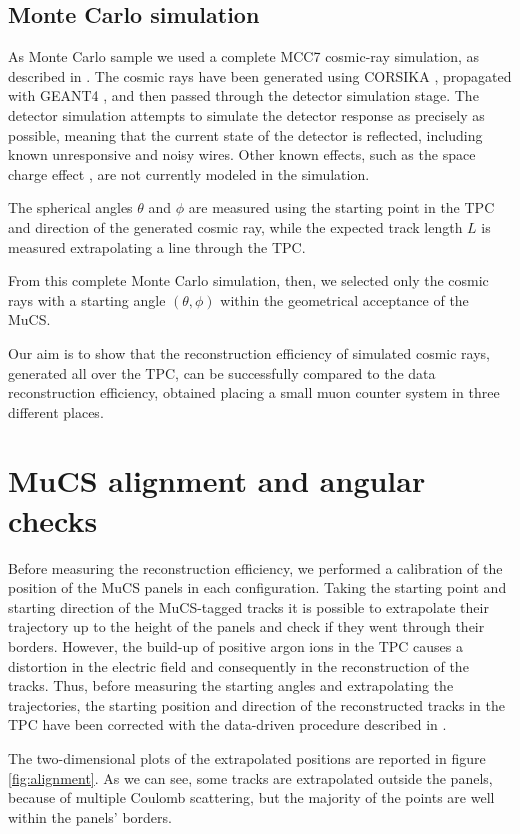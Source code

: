 \documentclass[a4paper]{scrartcl}
\begin{document}
\subsection{Monte Carlo simulation}
As Monte Carlo sample we used a complete MCC7 cosmic-ray simulation, as described in \cite{cosmic}. The cosmic rays have been generated using CORSIKA \cite{corsika},  propagated with GEANT4 \cite{geant}, and then passed through the detector simulation stage. The detector simulation attempts to simulate the detector response as precisely as possible, meaning that the current state of the detector is reflected, including known unresponsive and noisy wires. Other known effects, such as the space charge effect \cite{sce}, are not currently modeled in the simulation.

The spherical angles $\theta$ and $\phi$ are measured using the starting point in the TPC and direction of the generated cosmic ray, while the expected track length $L$ is measured extrapolating a line through the TPC.

From this complete Monte Carlo simulation, then, we selected only the cosmic rays with a starting angle $(\theta,\phi)$ within the geometrical acceptance of the MuCS.

Our aim is to show that the reconstruction efficiency of simulated cosmic rays, generated all over the TPC, can be successfully compared to the data reconstruction efficiency, obtained placing a small muon counter system in three different places.

\section{MuCS alignment and angular checks}\label{sec:flux}
Before measuring the reconstruction efficiency, we performed a calibration of the position of the MuCS panels in each configuration. Taking the starting point and starting direction of the MuCS-tagged tracks it is possible to extrapolate their trajectory up to the height of the panels and check if they went through their borders. However, the build-up of positive argon ions in the TPC causes a distortion in the electric field and consequently in the reconstruction of the tracks. Thus, before measuring the starting angles and extrapolating the trajectories, the starting position and direction of the reconstructed tracks in the TPC have been corrected with the data-driven procedure described in \cite{sce}.

The two-dimensional plots of the extrapolated positions are reported in figure \ref{fig:alignment}. As we can see, some tracks are extrapolated outside the panels, because of multiple Coulomb scattering, but the majority of the points are well within the panels' borders.
\end{document}
